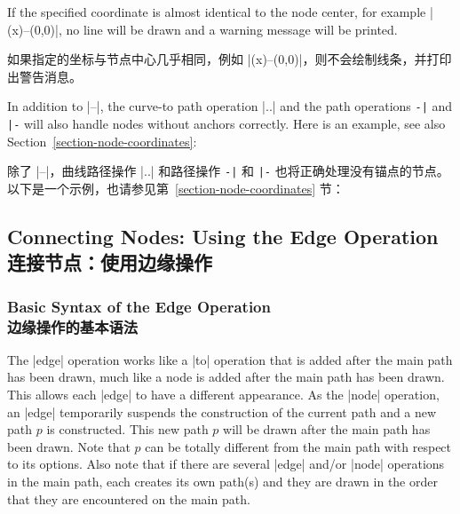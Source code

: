 \begin{enumerate}
        If the specified coordinate is almost identical to the node center, for
        example |(x)--(0,0)|, no line will be drawn and a warning message will
        be printed.

        如果指定的坐标与节点中心几乎相同，例如 |(x)--(0,0)|，则不会绘制线条，并打印出警告消息。



        In addition to |--|, the curve-to path operation |..| and the path
        operations \verb!-|! and \verb!|-! will also handle nodes without
        anchors correctly. Here is an example, see also
        Section~\ref{section-node-coordinates}:
        
        除了 |--|，曲线路径操作 |..| 和路径操作 \verb!-|! 和 \verb!|-! 也将正确处理没有锚点的节点。以下是一个示例，也请参见第~\ref{section-node-coordinates} 节：
\begin{codeexample}[]
\end{codeexample}
\end{enumerate}


\subsection{Connecting Nodes: Using the Edge Operation\\连接节点：使用边缘操作}
\label{section-nodes-edges}

\subsubsection{Basic Syntax of the Edge Operation\\边缘操作的基本语法}

The |edge| operation works like a |to| operation that is added after the main
path has been drawn, much like a node is added after the main path has been
drawn. This allows each |edge| to have a different appearance. As the |node|
operation, an |edge| temporarily suspends the construction of the current path
and a new path $p$ is constructed. This new path $p$ will be drawn after the
main path has been drawn. Note that $p$ can be totally different from the main
path with respect to its options. Also note that if there are several |edge|
and/or |node| operations in the main path, each creates its own path(s) and
they are drawn in the order that they are encountered on the main path.

